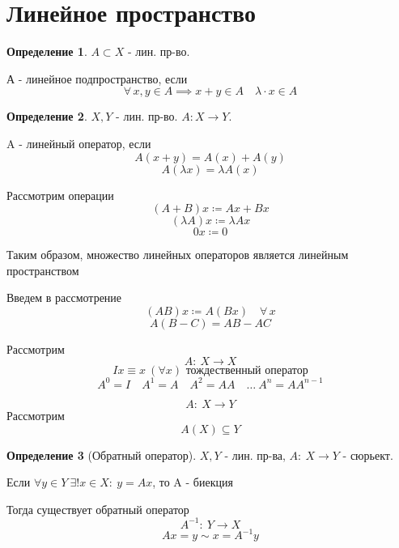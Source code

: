 \documentclass[a4paper]{article}
\theoremstyle{definition}
\newtheorem*{definition}{Определение}
\theoremstyle{remark}
\begin{document}
\section*{\centering Линейное пространство}
\begin{tcolorbox}
    \begin{definition}
        $ A \subset X $ - лин. пр-во.

        А - линейное подпространство, если 
        \[
            \forall \, x,y \in A \implies x+y \in A \quad \lambda \cdot x \in A
        \]
    \end{definition}
\end{tcolorbox}

\begin{tcolorbox}
    \begin{definition}
        $ X,Y $ - лин. пр-во. $ A: X \to Y $.

        A - линейный оператор, если 
        \[
            A(x+y) = A(x) + A(y)
        \]
        \[
            A(\lambda x) = \lambda A(x)
        \]
    \end{definition}
\end{tcolorbox}

Рассмотрим операции
\[
    (A+B)x \coloneq Ax + Bx
\]
\[
    (\lambda A)x \coloneq \lambda Ax
\]
\[
    0x \coloneq 0
\]

Таким образом, множество линейных операторов является линейным пространством

Введем в рассмотрение
\[
    (AB)x \coloneq A(Bx) \quad \forall\, x
\]
\[
    A(B-C) = AB - AC
\]

Рассмотрим
\[
    A: \ X \to X
\]
\[
    Ix \equiv x \ (\forall x) \text{ тождественный оператор}
\]
\[
    A^0 = I \quad A^1 = A \quad A^2 = A A \quad \dots \ A^n = A A^{n-1}
\]

\[
    A: \ X \to Y
\]
Рассмотрим
\[
    A(X) \subseteq Y
\]

\begin{tcolorbox}
    \begin{definition}[Обратный оператор]
        $ X,Y $ - лин. пр-ва, $ A: \ X \to Y $ - сюрьект.

        Если $ \forall y \in Y\  \exists ! x \in X: \ y = Ax $, то A - биекция

        Тогда существует обратный оператор
        \[
            A^{-1}: \ Y \to X
        \]
        \[
            Ax = y \sim x = A^{-1} y
        \]
    \end{definition}
\end{tcolorbox}
\end{document}
